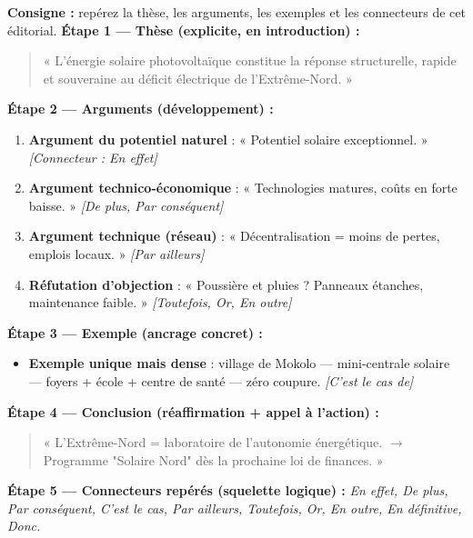 \documentclass[11pt]{article}
\begin{document}
\begin{exoresolu}
\textbf{Consigne :} repérez la thèse, les arguments, les exemples et les connecteurs de cet éditorial.
\tcblower
\textbf{Étape 1 — Thèse (explicite, en introduction) :}
\begin{quote}
« L'énergie solaire photovoltaïque constitue la réponse structurelle, rapide et souveraine au déficit électrique de l'Extrême-Nord. »
\end{quote}

\textbf{Étape 2 — Arguments (développement) :}
\begin{enumerate}
    \item \textbf{Argument du potentiel naturel} : « Potentiel solaire exceptionnel. » \emph{[Connecteur : En effet]}
    \item \textbf{Argument technico-économique} : « Technologies matures, coûts en forte baisse. » \emph{[De plus, Par conséquent]}
    \item \textbf{Argument technique (réseau)} : « Décentralisation = moins de pertes, emplois locaux. » \emph{[Par ailleurs]}
    \item \textbf{Réfutation d'objection} : « Poussière et pluies ? Panneaux étanches, maintenance faible. » \emph{[Toutefois, Or, En outre]}
\end{enumerate}

\textbf{Étape 3 — Exemple (ancrage concret) :}
\begin{itemize}
    \item \textbf{Exemple unique mais dense} : village de Mokolo — mini-centrale solaire — foyers + école + centre de santé — zéro coupure. \emph{[C'est le cas de]}
\end{itemize}

\textbf{Étape 4 — Conclusion (réaffirmation + appel à l'action) :}
\begin{quote}
« L'Extrême-Nord = laboratoire de l'autonomie énergétique. $\rightarrow$ Programme "Solaire Nord" dès la prochaine loi de finances. »
\end{quote}

\textbf{Étape 5 — Connecteurs repérés (squelette logique) :}
\emph{En effet, De plus, Par conséquent, C'est le cas, Par ailleurs, Toutefois, Or, En outre, En définitive, Donc.}
\end{exoresolu}
\end{document}
